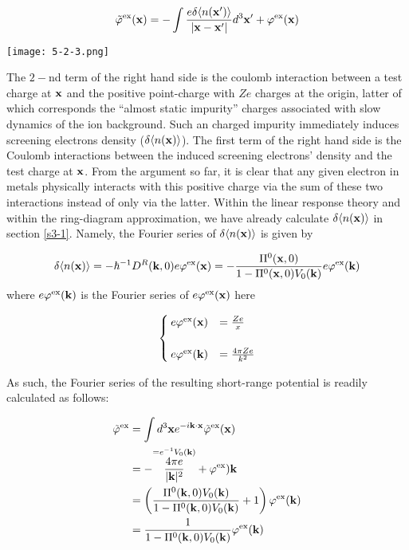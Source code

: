 \[\tilde\varphi^{\text{ex}}({\bf x})=-\int\frac{e\delta\langle n({\bf x}')\rangle}{|\bf x-x'|}d^3{\bf x'}+\varphi^{\text{ex}}({\bf x}) \]

\texttt{[image: 5-2-3.png]}

The $2-$nd term of the right hand side is the coulomb interaction between a test charge at $\bf x$ and the positive point-charge with $Ze$ charges at the origin, latter of which corresponds the ``almost static impurity'' charges associated with slow dynamics of the ion background. Such an charged impurity immediately induces screening electrons density ($\delta\langle n({\bf x})\rangle$). The first term of the right hand side is the Coulomb interactions between the induced screening electrons' density and the test charge at $\bf x$. From the argument so far, it is clear that any given electron in metals physically interacts with this positive charge via the sum of these two interactions instead of only via the latter. Within the linear response theory and within the ring-diagram approximation, we have already calculate $\delta\langle n({\bf x})\rangle$ in section \ref{s3-1}. Namely, the Fourier series of $\delta\langle n({\bf x})\rangle$ is given by

\[\delta\langle n({\bf x})\rangle =-\hbar^{-1}D^R({\bf k},0)e\varphi^{\text{ex}}({\bf x}) = -\frac{\Pi^0({\bf x},0)}{1- \Pi^0({\bf x},0)V_0({\bf k})}e\varphi^{\text{ex}}({\bf k})\]
where $e\varphi^{\text{ex}}({\bf k})$ is the Fourier series of $e\varphi^{\text{ex}}({\bf x})$ here

\[\begin{cases}
e\varphi^{\text{ex}}({\bf x}) &= \frac{Ze}{x}\\
&\\
e\varphi^{\text{ex}}({\bf k}) &= \frac{4\pi Ze}{k^2}
\end{cases}\]

As such, the Fourier series of the resulting short-range potential is readily calculated as follows:

\[\begin{split}
\tilde\varphi^{\text{ex}} &= \int d^3{\bf x} e^{-i\bf k\cdot x}\tilde\varphi^{\text{ex}}({\bf x})\\
&= -\overset{=e^{-1}V_0({\bf k})}{\frac{4\pi e}{|{\bf k}|^2}}+\varphi^{\text{ex}}){\bf k}\\
&=\left(\frac{\Pi^0({\bf k},0)V_0({\bf k})}{1 -\Pi^0({\bf k},0)V_0({\bf k})}+1\right)\varphi^{\text{ex}}({\bf k})\\
&= \frac{1}{1 - \Pi^0({\bf k},0)V_0({\bf k})}\varphi^{\text{ex}}({\bf k})
\end{split} \]


